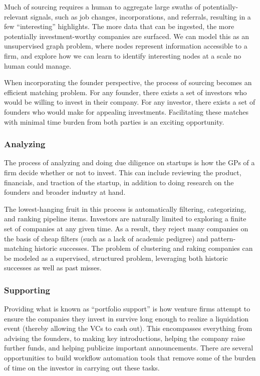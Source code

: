 Much of sourcing requires a human to aggregate large swaths of potentially-relevant signals, such as job changes, incorporations, and referrals, resulting in a few ``interesting'' highlights. The more data that can be ingested, the more potentially investment-worthy companies are surfaced. We can model this as an unsupervised graph problem, where nodes represent information accessible to a firm, and explore how we can learn to identify interesting nodes at a scale no human could manage.

When incorporating the founder perspective, the process of sourcing becomes an efficient matching problem. For any founder, there exists a set of investors who would be willing to invest in their company. For any investor, there exists a set of founders who would make for appealing investments. Facilitating these matches with minimal time burden from both parties is an exciting opportunity.

\subsubsection{Analyzing}

The process of analyzing and doing due diligence on startups is how the GPs of a firm decide whether or not to invest. This can include reviewing the product, financials, and traction of the startup, in addition to doing research on the founders and broader industry at hand.

The lowest-hanging fruit in this process is automatically filtering, categorizing, and ranking pipeline items. Investors are naturally limited to exploring a finite set of companies at any given time. As a result, they reject many companies on the basis of cheap filters (such as a lack of academic pedigree) and pattern-matching historic successes. The problem of clustering and raking companies can be modeled as a supervised, structured problem, leveraging both historic successes as well as past misses.

\subsubsection{Supporting}

Providing what is known as ``portfolio support'' is how venture firms attempt to ensure the companies they invest in survive long enough to realize a liquidation event (thereby allowing the VCs to cash out). This encompasses everything from advising the founders, to making key introductions, helping the company raise further funds, and helping publicize important announcements. There are several opportunities to build workflow automation tools that remove some of the burden of time on the investor in carrying out these tasks.

